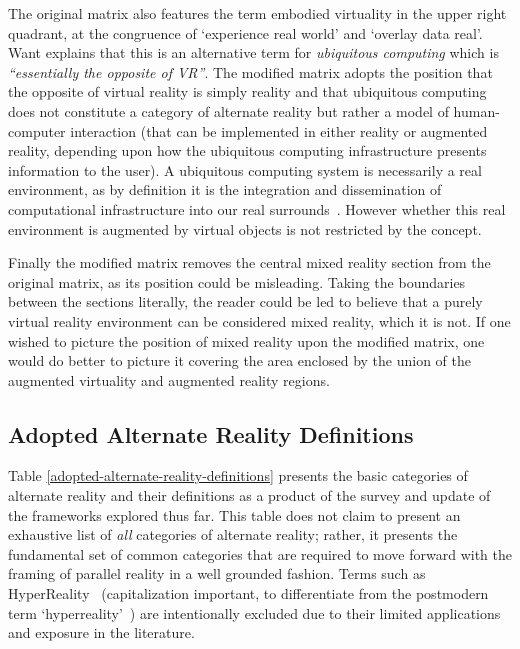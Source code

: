 The original matrix also features the term embodied virtuality in the upper right quadrant, at the congruence of `experience real world' and `overlay data real'. Want explains that this is an alternative term for \textit{ubiquitous computing} which is \textit{``essentially the opposite of VR''}. The modified matrix adopts the position that the opposite of virtual reality is simply reality and that ubiquitous computing does not constitute a category of alternate reality but rather a model of human-computer interaction (that can be implemented in either reality or augmented reality, depending upon how the ubiquitous computing infrastructure presents information to the user). A ubiquitous computing system is necessarily a real environment, as by definition it is the integration and dissemination of computational infrastructure into our real surrounds~\cite{York2004}. However whether this real environment is augmented by virtual objects is not restricted by the concept.

Finally the modified matrix removes the central mixed reality section from the original matrix, as its position could be misleading. Taking the boundaries between the sections literally, the reader could be led to believe that a purely virtual reality environment can be considered mixed reality, which it is not. If one wished to picture the position of mixed reality upon the modified matrix, one would do better to picture it covering the area enclosed by the union of the augmented virtuality and augmented reality regions.


\subsection{Adopted Alternate Reality Definitions}
\label{summaryofalternaterealitydefinitions}

Table \ref{adopted-alternate-reality-definitions} presents the basic categories of alternate reality and their definitions as a product of the survey and update of the frameworks explored thus far. This table does not claim to present an exhaustive list of \textit{all} categories of alternate reality; rather, it presents the fundamental set of common categories that are required to move forward with the framing of parallel reality in a well grounded fashion. Terms such as HyperReality~\cite{Terashima2001} (capitalization important, to differentiate from the postmodern term `hyperreality'~\cite{Baudrillard1994}) are intentionally excluded due to their limited applications and exposure in the literature.

